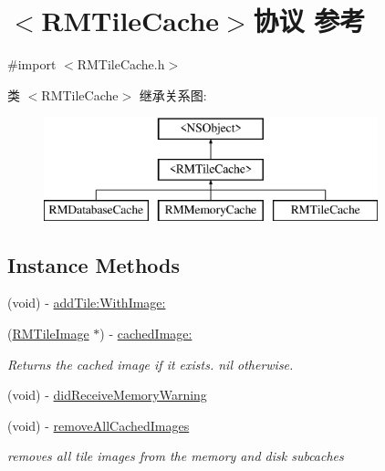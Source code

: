 \hypertarget{protocol_r_m_tile_cache-p}{\section{$<$R\-M\-Tile\-Cache$>$协议 参考}
\label{protocol_r_m_tile_cache-p}
}


{\ttfamily \#import $<$R\-M\-Tile\-Cache.\-h$>$}

类 $<$R\-M\-Tile\-Cache$>$ 继承关系图\-:\begin{figure}[H]
\begin{center}
\leavevmode
\includegraphics[height=3.000000cm]{protocol_r_m_tile_cache-p}
\end{center}
\end{figure}
\subsection*{Instance Methods}
\begin{DoxyCompactItemize}
\item 
(void) -\/ \hyperlink{protocol_r_m_tile_cache-p_a6a8e29b5f172b347d0ca556a643ee87c}{add\-Tile\-:\-With\-Image\-:}
\item 
(\hyperlink{interface_r_m_tile_image}{R\-M\-Tile\-Image} $\ast$) -\/ \hyperlink{protocol_r_m_tile_cache-p_a4710bfa32e9aa99e8c8f6a335fcadbc2}{cached\-Image\-:}
\begin{DoxyCompactList}\small\item\em Returns the cached image if it exists. nil otherwise. \end{DoxyCompactList}\item 
(void) -\/ \hyperlink{protocol_r_m_tile_cache-p_abd8c91f7aeefeeb8744537ed2f304449}{did\-Receive\-Memory\-Warning}
\item 
(void) -\/ \hyperlink{protocol_r_m_tile_cache-p_a57f54af62bb9c0e473ba2cd395864c4a}{remove\-All\-Cached\-Images}
\begin{DoxyCompactList}\small\item\em removes all tile images from the memory and disk subcaches \end{DoxyCompactList}\end{DoxyCompactItemize}


